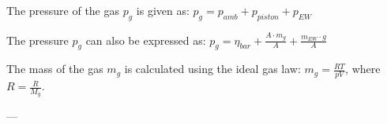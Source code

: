 The pressure of the gas \( p_g \) is given as:  
\( p_g = p_{amb} + p_{piston} + p_{EW} \)  

The pressure \( p_g \) can also be expressed as:  
\( p_g = \eta_{bar} + \frac{A \cdot m_g}{A} + \frac{m_{EW} \cdot g}{A} \)  

The mass of the gas \( m_g \) is calculated using the ideal gas law:  
\( m_g = \frac{RT}{pV} \), where \( R = \frac{R}{M_g} \).  

---